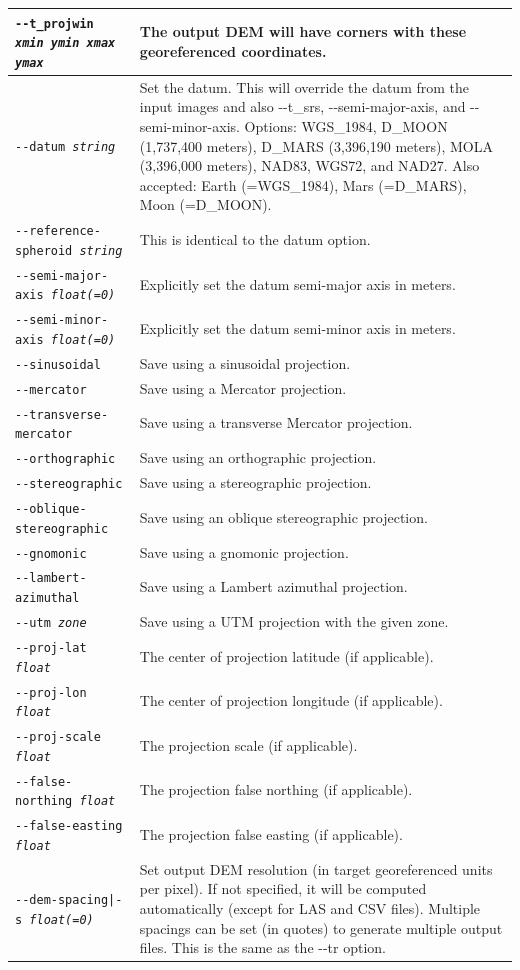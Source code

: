 \begin{longtable}{|p{8cm}|p{9cm}|}
\texttt{-\/-t\_projwin \textit{xmin ymin xmax ymax} } & The output DEM will have corners with these georeferenced coordinates. \\ \hline
\texttt{-\/-datum \textit{string}} & Set the datum. This will override the datum from the input images and also -\/-t\_srs, -\/-semi-major-axis, and -\/-semi-minor-axis. Options: WGS\_1984, D\_MOON (1,737,400 meters), D\_MARS (3,396,190 meters), MOLA (3,396,000 meters), NAD83, WGS72, and NAD27. Also accepted: Earth (=WGS\_1984), Mars (=D\_MARS), Moon (=D\_MOON). \\ \hline
\texttt{-\/-reference-spheroid \textit{string}} & This is identical to the datum option. \\ \hline
\texttt{-\/-semi-major-axis \textit{float(=0)}} & Explicitly set the datum semi-major axis in meters.\\ \hline
\texttt{-\/-semi-minor-axis \textit{float(=0)}} & Explicitly set the datum semi-minor axis in meters.\\ \hline
\texttt{-\/-sinusoidal} & Save using a sinusoidal projection. \\ \hline
\texttt{-\/-mercator} & Save using a Mercator projection. \\ \hline
\texttt{-\/-transverse-mercator} & Save using a transverse Mercator projection. \\ \hline
\texttt{-\/-orthographic} & Save using an orthographic projection. \\ \hline
\texttt{-\/-stereographic} & Save using a stereographic projection. \\ \hline
\texttt{-\/-oblique-stereographic} & Save using an oblique stereographic projection. \\ \hline
\texttt{-\/-gnomonic} & Save using a gnomonic projection. \\ \hline
\texttt{-\/-lambert-azimuthal} & Save using a Lambert azimuthal projection. \\ \hline
\texttt{-\/-utm \textit{zone}} & Save using a UTM projection with the given zone. \\ \hline
\texttt{-\/-proj-lat \textit{float}} & The center of projection latitude (if applicable). \\ \hline
\texttt{-\/-proj-lon \textit{float}} & The center of projection longitude (if applicable). \\ \hline
\texttt{-\/-proj-scale \textit{float}} & The projection scale (if applicable). \\ \hline
\texttt{-\/-false-northing \textit{float}} & The projection false northing (if applicable). \\ \hline
\texttt{-\/-false-easting \textit{float}} & The projection false easting (if applicable). \\ \hline
\texttt{-\/-dem-spacing|-s \textit{float(=0)}} & Set output DEM resolution (in target georeferenced units per pixel). If not specified, it will be computed automatically (except for LAS and CSV files). Multiple spacings can be set (in quotes) to generate multiple output files. This is the same as the -\/-tr option. \\ \hline


\end{longtable}
